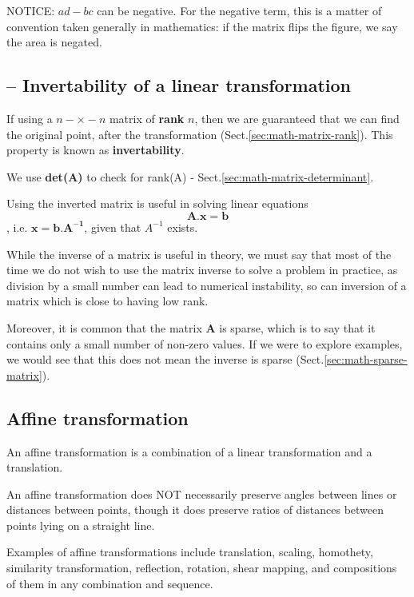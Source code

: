 NOTICE: $ad-bc$ can be negative.
For the negative term, this is a matter of convention taken generally in
mathematics: if the matrix flips the figure, we say the area is negated.


\subsection{-- Invertability of a linear transformation}


If using a $n-\times-n$ matrix of {\bf rank} $n$, then we are guaranteed that we
can find the original point, after the transformation
(Sect.\ref{sec:math-matrix-rank}). This property is known as {\bf invertability}.

We use {\bf det(A)} to check for rank(A) - Sect.\ref{sec:math-matrix-determinant}.

Using the inverted matrix is useful in solving linear equations
\begin{equation}
\mathbf{A}.\mathbf{x} = \mathbf{b}
\end{equation}
, i.e. $\mathbf{x = b.A^{-1}}$, given that $A^{-1}$ exists.

While the inverse of a matrix is useful in theory, we must say that most of the
time we do not wish to use the matrix inverse to solve a problem in practice, as
division by a small number can lead to numerical instability, so can inversion
of a matrix which is close to having low rank.

Moreover, it is common that the matrix $\mathbf{A}$ is sparse, which is to say
that it contains only a small number of non-zero values.
If we were to explore examples, we would see that this does not mean the inverse
is sparse (Sect.\ref{sec:math-sparse-matrix}).


\subsection{Affine transformation}
\label{sec:affine-transformation}

An affine transformation is a combination of a linear transformation and a
translation.

An affine transformation does NOT necessarily preserve angles between lines or
distances between points, though it does preserve ratios of distances between
points lying on a straight line.

Examples of affine transformations include translation, scaling, homothety,
similarity transformation, reflection, rotation, shear mapping, and compositions
of them in any combination and sequence.

